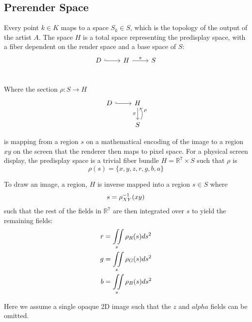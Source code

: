 \documentclass[../main.tex]{subfiles}
\begin{document}
\subsection{Prerender Space}
\label{sec:display}

Every point $k \in K$ maps to a space $S_{k} \in S$, which is the topology of the output of the artist $A$. The space $H$ is a total space representing the predisplay space, with a fiber dependent on the render space and a base space of $S$:
\begin{equation}
    \begin{tikzcd}
        D \arrow[r, hook] & H \arrow[r, "\pi"] &S\\   
        \end{tikzcd}
\end{equation}


Where the section $\rho: S \rightarrow H$
\begin{equation}
    \begin{tikzcd}
        D \arrow[r, hook] & H \arrow[d, "\pi"']              \\
                          & S \arrow[u, "\rho"', bend right]
        \end{tikzcd}
\end{equation}

 is mapping from a region $s$ on a mathematical encoding of the image to a region $xy$ on the screen that the renderer then maps to pixel space. For a physical screen display, the predisplay space is a trivial fiber bundle $H=\mathbb{R}^{7}\times S$ such that $\rho$ is
\begin{equation}
    \rho(s)  = \{x, y, z, r, g, b, a\}
    \label{eq:rho}
\end{equation}

To draw an image, a region, $H$ is inverse mapped into a region $s \in S$ where
\begin{equation}
s = \rho^{-1}_{\tiny{XY}}(xy)
\end{equation}
such that the rest of the fields in $\mathbb{R}^{7}$ are then integrated over $s$ to yield the remaining fields:
\begin{align}
    r &= \iint\limits_s \rho_{\tiny{R}}(s)ds^{2}\\
    g &= \iint\limits_s \rho_{\tiny{G}}(s)ds^{2}\\
    b &= \iint\limits_s \rho_{\tiny{B}}(s)ds^{2}
\end{align}

Here we assume a single opaque 2D image such that the $z$ and $alpha$ fields can be omitted. 
\end{document}
